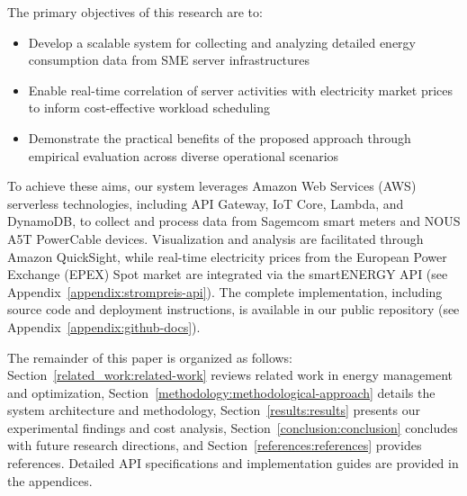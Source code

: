 The primary objectives of this research are to:
\begin{itemize}
\item Develop a scalable system for collecting and analyzing detailed energy consumption data from SME server infrastructures
\item Enable real-time correlation of server activities with electricity market prices to inform cost-effective workload scheduling
\item Demonstrate the practical benefits of the proposed approach through empirical evaluation across diverse operational scenarios
\end{itemize}

To achieve these aims, our system leverages Amazon Web Services (AWS) serverless technologies, including API Gateway, IoT Core, Lambda, and DynamoDB, to collect and process data from Sagemcom smart meters and NOUS A5T PowerCable devices. Visualization and analysis are facilitated through Amazon QuickSight, while real-time electricity prices from the European Power Exchange (EPEX) Spot market are integrated via the smartENERGY API (see Appendix~\ref{appendix:strompreis-api}). The complete implementation, including source code and deployment instructions, is available in our public repository (see Appendix~\ref{appendix:github-docs}).

The remainder of this paper is organized as follows: Section~\ref{related_work:related-work} reviews related work in energy management and optimization, Section~\ref{methodology:methodological-approach} details the system architecture and methodology, Section~\ref{results:results} presents our experimental findings and cost analysis, Section~\ref{conclusion:conclusion} concludes with future research directions, and Section~\ref{references:references} provides references. Detailed API specifications and implementation guides are provided in the appendices.